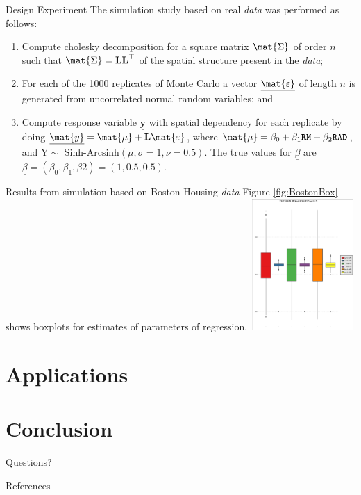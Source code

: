 \documentclass[10pt,unknownkeysallowed]{beamer}
\begin{document}
\begin{frame}{ Design Experiment}
The simulation study based on real \textit{data} was performed as follows:
\begin{enumerate}
   \item Compute cholesky decomposition for a square matrix $\mat{\Sigma}$ of order $n$ such that $\mat{\Sigma}= \textbf{\textrm{L}}\textbf{\textrm{L}}^\top$ of the spatial structure present in the  \textit{data};
    \item  For each of the 1000 replicates of Monte Carlo a vector $\underline{\mat{\varepsilon}}$ of length $n$ is generated from uncorrelated normal random variables; and
    \item  Compute response variable $\underline{\mathbf{y}}$ with spatial dependency for each replicate by doing $\underline{\mat{y}}= \mat{\mu} + \textbf{\textrm{L}}\mat{\varepsilon}$, where $\mat{\mu} = \beta_0+ \beta_1\texttt{RM} + \beta_2\texttt{RAD}$, and $\textrm{Y}\sim \textrm{ Sinh-Arcsinh}(\mu,\sigma=1,\nu=0.5)$. The true values for $\underline{\beta}$ are
    $\underline{\beta}=(\beta_0,\beta_1,\beta2)=(1,0.5,0.5)$.
\end{enumerate}
\end{frame}

\begin{frame}{Results from simulation based on Boston Housing \textit{data}}
Figure \ref{fig:BostonBox} shows boxplots for estimates of parameters of regression.
\center\includegraphics[width=4cm,height=5cm]{Betas_Boston_boxplot.pdf}\label{fig:BostonBox}
\end{frame}

\section{Applications}



\section{Conclusion}

{
\begin{frame}[standout]
  Questions?
\end{frame}
}


\begin{frame}[allowframebreaks]{References}

  
  

\end{frame}
\end{document}

